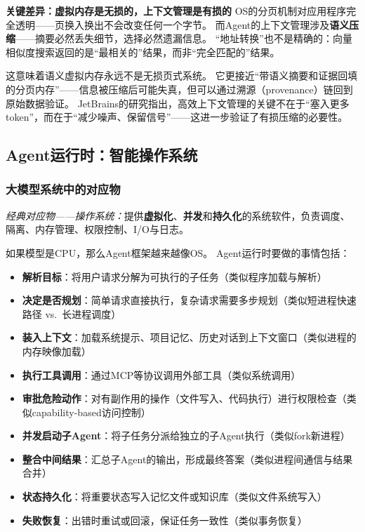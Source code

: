 \textbf{关键差异：虚拟内存是\textbf{无损}的，上下文管理是\textbf{有损}的}
OS的分页机制对应用程序完全透明——页换入换出不会改变任何一个字节。
而Agent的上下文管理涉及\textbf{语义压缩}——摘要必然丢失细节，选择必然遗漏信息。
``地址转换''也不是精确的：向量相似度搜索返回的是``最相关的''结果，而非``完全匹配的''结果。

这意味着语义虚拟内存永远不是无损页式系统。
它更接近``带语义摘要和证据回填的分页内存''——信息被压缩后可能失真，但可以通过溯源（provenance）链回到原始数据验证。
JetBrains的研究指出，高效上下文管理的关键不在于``塞入更多token''，而在于``减少噪声、保留信号''\cite{jetbrains2025context}——这进一步验证了有损压缩的必要性。

\subsection{Agent运行时：智能操作系统}
\label{sec:agent}

\subsubsection{大模型系统中的对应物}

\textit{经典对应物——操作系统：}提供\textbf{虚拟化}、\textbf{并发}和\textbf{持久化}的系统软件，负责调度、隔离、内存管理、权限控制、I/O与日志\cite{ostep_2023}。

如果模型是CPU，那么Agent框架越来越像OS。
Agent运行时要做的事情包括：
\begin{itemize}[nosep]
\item \textbf{解析目标}：将用户请求分解为可执行的子任务（类似程序加载与解析）
\item \textbf{决定是否规划}：简单请求直接执行，复杂请求需要多步规划（类似短进程快速路径 vs.\ 长进程调度）
\item \textbf{装入上下文}：加载系统提示、项目记忆、历史对话到上下文窗口（类似进程的内存映像加载）
\item \textbf{执行工具调用}：通过MCP等协议调用外部工具（类似系统调用）
\item \textbf{审批危险动作}：对有副作用的操作（文件写入、代码执行）进行权限检查（类似capability-based访问控制）
\item \textbf{并发启动子Agent}：将子任务分派给独立的子Agent执行（类似fork新进程）
\item \textbf{整合中间结果}：汇总子Agent的输出，形成最终答案（类似进程间通信与结果合并）
\item \textbf{状态持久化}：将重要状态写入记忆文件或知识库（类似文件系统写入）
\item \textbf{失败恢复}：出错时重试或回滚，保证任务一致性（类似事务恢复）
\end{itemize}


